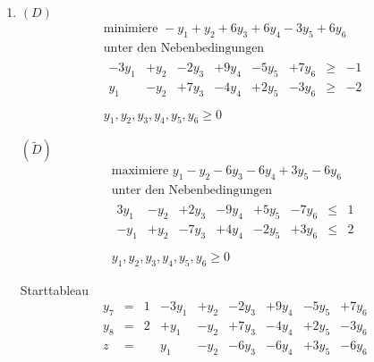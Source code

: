 \documentclass[a4paper]{scrartcl}
\begin{document}
\begin{enumerate}[label=\bfseries\arabic*.]
\begin{enumerate}
\begin{enumerate}[(i)]
\begin{enumerate}
\begin{itemize}
                                \end{itemize}
                        \end{enumerate}
                \end{enumerate}

        \end{enumerate}

    \item %
        $(D)$
        \begin{equation}
            \begin{gathered}
                \text{minimiere } -y_1 +y_2 +6y_3 +6y_4 -3y_5 +6y_6 \\
                \text{unter den Nebenbedingungen} \\
                \begin{array}{rrrrrrcr}
                    -3y_1 & +y_2 & -2y_3 & +9y_4 & -5y_5 & +7y_6 & \geq & -1 \\
                    y_1 & -y_2 & +7y_3 & -4y_4 & +2y_5 & -3y_6 & \geq & -2 \\
                \end{array} \\
                y_1, y_2, y_3, y_4, y_5, y_6 \geq 0
            \end{gathered}
        \end{equation}

        $(\tilde D)$
        \begin{equation}
            \begin{gathered}
                \text{maximiere } y_1 -y_2 -6y_3 -6y_4 +3y_5 -6y_6 \\
                \text{unter den Nebenbedingungen} \\
                \begin{array}{rrrrrrcr}
                    3y_1 & -y_2 & +2y_3 & -9y_4 & +5y_5 & -7y_6 & \leq & 1 \\
                    -y_1 & +y_2 & -7y_3 & +4y_4 & -2y_5 & +3y_6 & \leq & 2 \\
                \end{array} \\
                y_1, y_2, y_3, y_4, y_5, y_6 \geq 0
            \end{gathered}
        \end{equation}

        Starttableau
        \begin{equation}
            \begin{array}{rcrrrrrrr}
                y_7 & = & 1 & -3y_1 & +y_2 & -2y_3 & +9y_4 & -5y_5 & +7y_6 \\
                y_8 & = & 2 & +y_1 & -y_2 & +7y_3 & -4y_4 & +2y_5 & -3y_6 \\
                \hline
                z & = & & y_1 & -y_2 & -6y_3 & -6y_4 & +3y_5 & -6y_6
            \end{array}
        \end{equation}


\end{enumerate}
\end{document}
